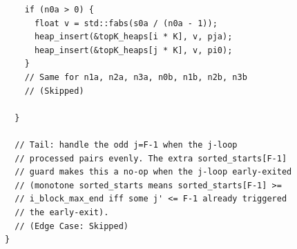 \documentclass[letterpaper]{article}
\begin{document}
{\begin{Verbatim}
    if (n0a > 0) {
      float v = std::fabs(s0a / (n0a - 1));
      heap_insert(&topK_heaps[i * K], v, pja);
      heap_insert(&topK_heaps[j * K], v, pi0);
    }
    // Same for n1a, n2a, n3a, n0b, n1b, n2b, n3b
    // (Skipped)

  }

  // Tail: handle the odd j=F-1 when the j-loop 
  // processed pairs evenly. The extra sorted_starts[F-1]
  // guard makes this a no-op when the j-loop early-exited 
  // (monotone sorted_starts means sorted_starts[F-1] >= 
  // i_block_max_end iff some j' <= F-1 already triggered
  // the early-exit).
  // (Edge Case: Skipped)
}
\end{Verbatim}
}
\end{document}
